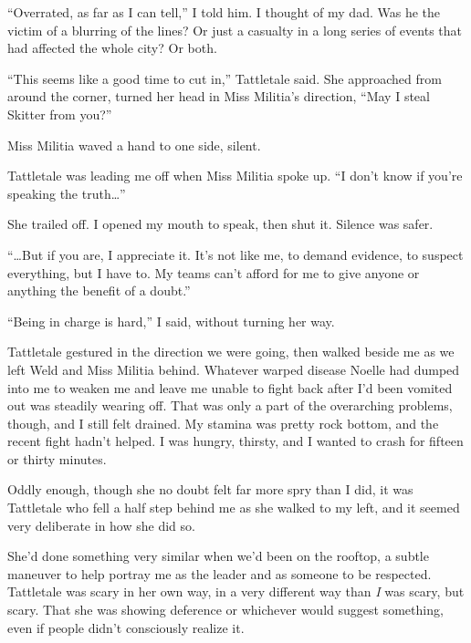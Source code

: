 ``Overrated, as far as I can tell,'' I told him.  I thought of my dad.  Was he the victim of a blurring of the lines?  Or just a casualty in a long series of events that had affected the whole city?  Or both.



``This seems like a good time to cut in,'' Tattletale said.  She approached from around the corner, turned her head in Miss Militia's direction, ``May I steal Skitter from you?''



Miss Militia waved a hand to one side, silent.



Tattletale was leading me off when Miss Militia spoke up.  ``I don't know if you're speaking the truth\ldots''



She trailed off.  I opened my mouth to speak, then shut it.  Silence was safer.



``\ldots{}But if you are, I appreciate it.  It's not like me, to demand evidence, to suspect everything, but I have to.  My teams can't afford for me to give anyone or anything the benefit of a doubt.''



``Being in charge is hard,'' I said, without turning her way.



Tattletale gestured in the direction we were going, then walked beside me as we left Weld and Miss Militia behind.  Whatever warped disease Noelle had dumped into me to weaken me and leave me unable to fight back after I'd been vomited out was steadily wearing off.  That was only a part of the overarching problems, though, and I still felt drained.  My stamina was pretty rock bottom, and the recent fight hadn't helped.  I was hungry, thirsty, and I wanted to crash for fifteen or thirty minutes.



Oddly enough, though she no doubt felt far more spry than I did, it was Tattletale who fell a half step behind me as she walked to my left, and it seemed very deliberate in how she did so.



She'd done something very similar when we'd been on the rooftop, a subtle maneuver to help portray me as the leader and as someone to be respected.  Tattletale was scary in her own way, in a very different way than \emph{I }was scary, but scary.  That she was showing deference or whichever would suggest something, even if people didn't consciously realize it.



